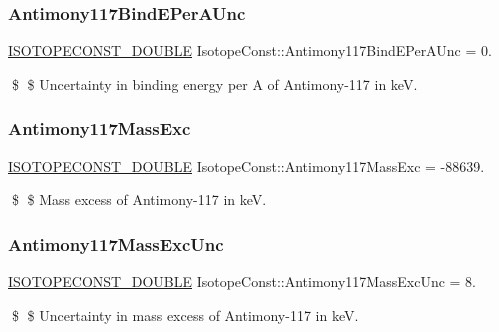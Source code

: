 \subsubsection{\texorpdfstring{Antimony117\+Bind\+E\+Per\+A\+Unc}{Antimony117BindEPerAUnc}}
{\footnotesize\ttfamily \mbox{\hyperlink{group___isotope_const-_macros_ga8f45a7272ce02c0b4c65c44636ed719a}{I\+S\+O\+T\+O\+P\+E\+C\+O\+N\+S\+T\+\_\+\+D\+O\+U\+B\+LE}} Isotope\+Const\+::\+Antimony117\+Bind\+E\+Per\+A\+Unc = 0.}

\$ \$ Uncertainty in binding energy per A of Antimony-\/117 in keV. \mbox{\label{group___isotope_const-_antimony-_sb117_ga9d7f87558dc086cb0264d450c46271f9}} 
\subsubsection{\texorpdfstring{Antimony117\+Mass\+Exc}{Antimony117MassExc}}
{\footnotesize\ttfamily \mbox{\hyperlink{group___isotope_const-_macros_ga8f45a7272ce02c0b4c65c44636ed719a}{I\+S\+O\+T\+O\+P\+E\+C\+O\+N\+S\+T\+\_\+\+D\+O\+U\+B\+LE}} Isotope\+Const\+::\+Antimony117\+Mass\+Exc = -\/88639.}

\$ \$ Mass excess of Antimony-\/117 in keV. \mbox{\label{group___isotope_const-_antimony-_sb117_ga3698f18b5229c3e9ffb5182d488d944b}} 
\subsubsection{\texorpdfstring{Antimony117\+Mass\+Exc\+Unc}{Antimony117MassExcUnc}}
{\footnotesize\ttfamily \mbox{\hyperlink{group___isotope_const-_macros_ga8f45a7272ce02c0b4c65c44636ed719a}{I\+S\+O\+T\+O\+P\+E\+C\+O\+N\+S\+T\+\_\+\+D\+O\+U\+B\+LE}} Isotope\+Const\+::\+Antimony117\+Mass\+Exc\+Unc = 8.}

\$ \$ Uncertainty in mass excess of Antimony-\/117 in keV. \mbox{\label{group___isotope_const-_antimony-_sb117_gabcdd6f8277c96d44867b74b92a8f05ca}} 
